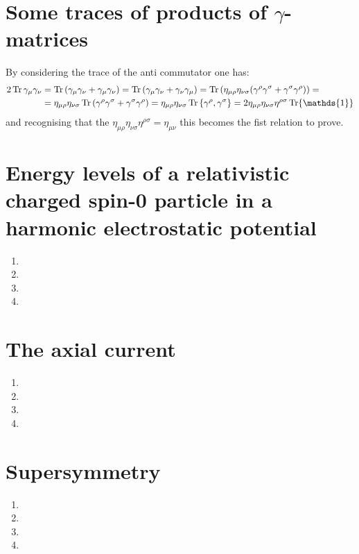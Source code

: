 \documentclass[11pt, oneside]{article}   	%
\begin{document}
\section{Some traces of products of $\gamma$-matrices}

By considering the trace of the anti commutator one has:
\begin{align*}
	 2 \Tr \gamma_\mu \gamma_\nu &= \Tr \qty(\gamma_\mu \gamma_\nu + \gamma_\mu \gamma_\nu) = \Tr \qty(\gamma_\mu \gamma_\nu + \gamma_\nu \gamma_\mu) = \Tr \qty(\eta_{\mu\rho} \eta_{\nu\sigma} \qty(\gamma^\rho \gamma^\sigma + \gamma^\sigma \gamma^\rho) ) = \\
	 &= \eta_{\mu\rho} \eta_{\nu\sigma} \Tr \qty(\gamma^\rho \gamma^\sigma + \gamma^\sigma \gamma^\rho) = \eta_{\mu\rho} \eta_{\nu\sigma} \Tr \acomm{\gamma^\rho}{\gamma^\sigma} = 2\eta_{\mu\rho} \eta_{\nu\sigma} \eta^{\rho\sigma} \Tr \mathds{1}
\end{align*}
and recognising that the $\eta_{\mu\rho} \eta_{\nu\sigma} \eta^{\rho\sigma} = \eta_{\mu\nu}$ this becomes the fist relation to prove.



\section{Energy levels of a relativistic charged spin-0 particle in a harmonic electrostatic potential}

\begin{enumerate}[label=\alph*)]

\item

\item

\item

\item

\end{enumerate}

\section{The axial current}

\begin{enumerate}[label=\alph*)]

\item

\item

\item

\item

\end{enumerate}

\section{Supersymmetry}

\begin{enumerate}[label=\alph*)]

\item

\item

\item

\item

\end{enumerate}
\end{document}
